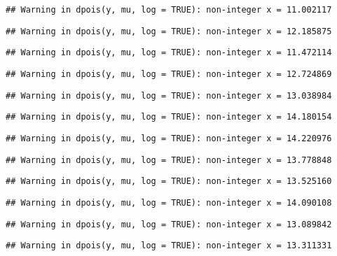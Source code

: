 \documentclass[
]{article}
\begin{document}
\begin{verbatim}
## Warning in dpois(y, mu, log = TRUE): non-integer x = 11.002117
\end{verbatim}

\begin{verbatim}
## Warning in dpois(y, mu, log = TRUE): non-integer x = 12.185875
\end{verbatim}

\begin{verbatim}
## Warning in dpois(y, mu, log = TRUE): non-integer x = 11.472114
\end{verbatim}

\begin{verbatim}
## Warning in dpois(y, mu, log = TRUE): non-integer x = 12.724869
\end{verbatim}

\begin{verbatim}
## Warning in dpois(y, mu, log = TRUE): non-integer x = 13.038984
\end{verbatim}

\begin{verbatim}
## Warning in dpois(y, mu, log = TRUE): non-integer x = 14.180154
\end{verbatim}

\begin{verbatim}
## Warning in dpois(y, mu, log = TRUE): non-integer x = 14.220976
\end{verbatim}

\begin{verbatim}
## Warning in dpois(y, mu, log = TRUE): non-integer x = 13.778848
\end{verbatim}

\begin{verbatim}
## Warning in dpois(y, mu, log = TRUE): non-integer x = 13.525160
\end{verbatim}

\begin{verbatim}
## Warning in dpois(y, mu, log = TRUE): non-integer x = 14.090108
\end{verbatim}

\begin{verbatim}
## Warning in dpois(y, mu, log = TRUE): non-integer x = 13.089842
\end{verbatim}

\begin{verbatim}
## Warning in dpois(y, mu, log = TRUE): non-integer x = 13.311331
\end{verbatim}
\end{document}
